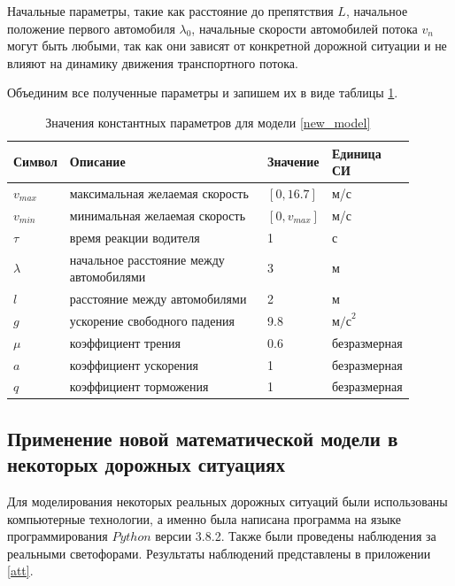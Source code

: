 \documentclass[12pt, a4paper]{extarticle}
\numberwithin{equation}{section}
\numberwithin{figure}{section}
\begin{document}
Начальные параметры, такие как расстояние до препятствия $L$, начальное положение первого автомобиля $\lambda_0$, начальные скорости автомобилей потока $v_n$ могут быть любыми, так как они зависят от конкретной дорожной ситуации и не влияют на динамику движения транспортного потока.

Объединим все полученные параметры и запишем их в виде таблицы \ref{real_parameters}.
\begin{table}[h!]
	\caption{Значения константных параметров для модели \eqref{new_model} }
	\label{real_parameters}
	\begin{center}
		\begin{tabularx}{\textwidth}{p{0.12\linewidth}p{0.52\linewidth}p{0.11\linewidth}p{0.15\linewidth}}			
			\hline
			\rule{0cm}{0,5cm}
			Символ & Описание & Значение & Единица СИ \\
			[3pt]\hline
			$v_{max}$ & максимальная желаемая скорость& $[0,16.7]$&м/с\\
			$v_{min}$ & минимальная желаемая скорость& $[0,v_{max}]$&м/с\\ 
			$\tau$ & время реакции водителя& 1&с\\
			$\lambda$ & начальное расстояние между автомобилями& 3&м\\
			$l$ & расстояние между автомобилями& 2&м\\
			$g$ & ускорение свободного падения& 9.8&$\text{м/с}^2$\\ 
			$\mu$ & коэффициент трения& 0.6& безразмерная\\ 
			$a$ & коэффициент ускорения& 1& безразмерная\\
			$q$ & коэффициент торможения& 1& безразмерная\\
			\hline
		\end{tabularx}
	\end{center}
\end{table}
\newline 

\subsection{Применение новой математической модели в некоторых дорожных ситуациях}

Для моделирования некоторых реальных дорожных ситуаций были использованы компьютерные технологии, а именно была написана программа на языке программирования $Python$ версии 3.8.2. Также были проведены наблюдения за реальными светофорами. Результаты наблюдений представлены в приложении \ref{att}.
\end{document}
